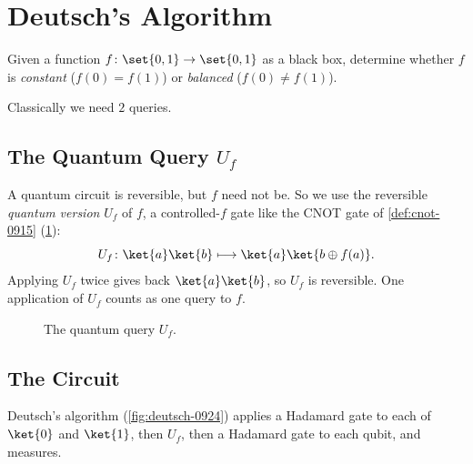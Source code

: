 
\section{Deutsch's Algorithm}

\begin{problem}
    Given a function $f \colon \set{0,1} \to \set{0,1}$ as a black box, determine whether $f$ is
    \emph{constant} ($f(0) = f(1)$) or \emph{balanced} ($f(0) \neq f(1)$).
\end{problem}

Classically we need $2$ queries.

\subsection{The Quantum Query \texorpdfstring{$U_f$}{Uf}}

A quantum circuit is reversible, but $f$ need not be. So we use the reversible
\emph{quantum version} $U_f$ of $f$, a controlled-$f$ gate like the CNOT gate of
\cref{def:cnot-0915} (\cref{fig:uf-0924}):
\[U_f \colon \ket{a}\ket{b} \longmapsto \ket{a}\ket{b \oplus f(a)}.\]
Applying $U_f$ twice gives back $\ket{a}\ket{b}$, so $U_f$ is reversible. One application of $U_f$
counts as one query to $f$.

\begin{figure}[ht]
    \centering
    \caption{The quantum query $U_f$.}
    \label{fig:uf-0924}
\end{figure}

\subsection{The Circuit}

Deutsch's algorithm (\cref{fig:deutsch-0924}) applies a Hadamard gate to each of $\ket{0}$ and
$\ket{1}$, then $U_f$, then a Hadamard gate to each qubit, and measures.

